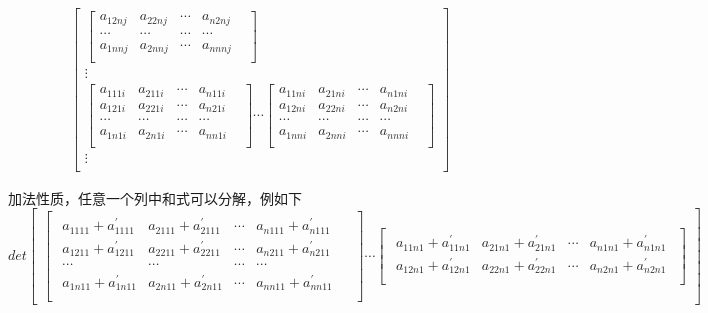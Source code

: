 \documentclass[twoside,a4paper,CCT]{cctart}   %
\begin{document}
\begin{define}
\begin{list}{}
\begin{align*}
\begin{bmatrix}
\begin{bmatrix}
  a_{12nj}& a_{22nj}&\cdots&a_{n2nj}\\
  \cdots&\cdots&\cdots &\cdots& \\
  a_{1nnj }& a_{2nnj}&\cdots&a_{nnnj}\\
  \end{bmatrix}\\
\vdots\\
 \begin{bmatrix}
   a_{111i}& a_{211i}&\cdots&a_{n11i}\\
   a_{121i}& a_{221i}&\cdots&a_{n21i}\\
  \cdots&\cdots&\cdots &\cdots& \\
a_{1n1i}& a_{2n1i}&\cdots&a_{nn1i}\\
\end{bmatrix}
\cdots
\begin{bmatrix}
  a_{11ni}& a_{21ni}&\cdots&a_{n1ni}\\
  a_{12ni}& a_{22ni}&\cdots&a_{n2ni}\\
  \cdots&\cdots&\cdots &\cdots& \\
  a_{1nni}& a_{2nni}&\cdots&a_{nnni}\\
  \end{bmatrix}\\
\vdots\\
    \end{bmatrix}
\end{align*}
 \item
 加法性质，任意一个列中和式可以分解，例如下
 $$det\begin{bmatrix}
 \begin{bmatrix}\begin{smallmatrix}
 a_{1111} + a_{1111}^{'}& a_{2111} + a_{2111}^{'}&\cdots&a_{n111} + a_{n111}^{'}\\
 a_{1211} + a_{1211}^{'}& a_{2211} + a_{2211}^{'}&\cdots&a_{n211} + a_{n211}^{'}\\
  \cdots&\cdots&\cdots &\cdots& \\
a_{1n11} + a_{1n11}^{'}& a_{2n11} + a_{2n11}^{'}&\cdots&a_{nn11} + a_{nn11}^{'}\\
\end{smallmatrix}\end{bmatrix}
\cdots
\begin{bmatrix}\begin{smallmatrix}
  a_{11n1} + a_{11n1}^{'}& a_{21n1} + a_{21n1}^{'}&\cdots&a_{n1n1} + a_{n1n1}^{'}\\
a_{12n1} + a_{12n1}^{'}& a_{22n1} + a_{22n1}^{'}&\cdots&a_{n2n1} + a_{n2n1}^{'}\\

\end{smallmatrix}
\end{bmatrix}
\end{bmatrix}$$
\end{list}
\end{define}
\end{document}
